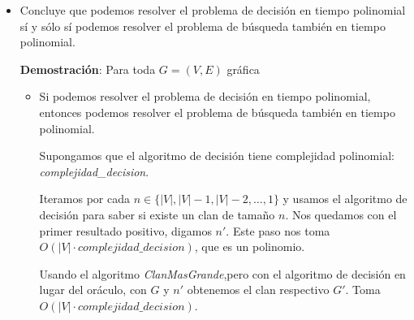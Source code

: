 \begin{itemize}
    Teniendo el $k'$. Consideramos el siguiente pseudocódigo:
    \begin{algorithmic}[1]
    \Require Gráfica $G = (V, E)$, k' el tamaño del clan más grande en G
    \Ensure $G'$ el clan más grande de $G$
        \State $G' \gets G$
                \State $G' \gets G' - \{v\}$
            \EndIf{}
        \EndFor{}
        \State \Return $G'$
    \EndFunction
    \end{algorithmic}

    El algoritmo solo considera en $G'$ los vértices que sí forman parte de un clan de tamaño $k'$. Para todo vértice que no figura dentro del clan, se descarta usando el oráculo. Al iterar sobre los vértices $V$, la complejidad del algoritmo es $O(|V|)$

    La complejidad conjunta de ambos algortimos es de $O(\log |V| + |V|) = O(|V|)$.

    Por tanto, solo gastando una cantidad polinomial de monedas podemos encontrar el clan de tamaño máximo de una gráfica.

    \item Concluye que podemos resolver el problema de decisión en tiempo polinomial sí y sólo sí podemos resolver el problema de búsqueda también en tiempo polinomial.

    \textbf{Demostración}: Para toda $G = (V, E)$ gráfica

    \begin{itemize}
        \item Si podemos resolver el problema de decisión en tiempo polinomial, entonces podemos resolver el problema de búsqueda también en tiempo polinomial.
        
        \vspace{0.5em}
        
        Supongamos que el algoritmo de decisión tiene complejidad polinomial: \textit{complejidad\_decision}.

        Iteramos por cada $n \in \{|V|, |V| -1, |V| -2, \dots, 1\}$ y usamos el algoritmo de decisión para saber si existe un clan de tamaño $n$. Nos quedamos con el primer resultado positivo, digamos $n'$. Este paso nos toma $O(|V| \cdot complejidad\_decision)$, que es un polinomio.
        
        Usando el algoritmo \textit{ClanMasGrande},pero con el algoritmo de decisión en lugar del oráculo, con $G$ y $n'$ obtenemos el clan respectivo $G'$. Toma $O(|V| \cdot complejidad\_decision)$.


\end{itemize}
\end{itemize}
